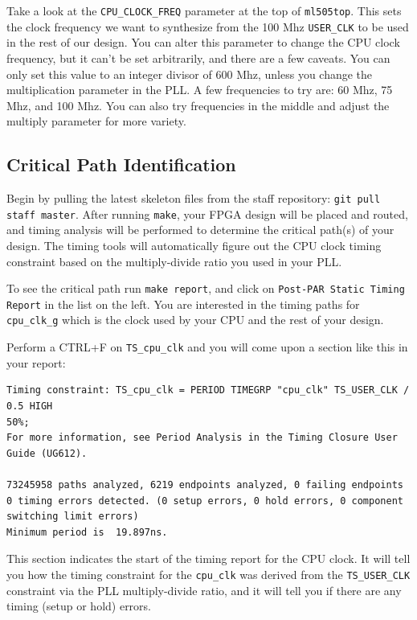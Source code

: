 \documentclass[11pt]{article}
\begin{document}
Take a look at the \verb|CPU_CLOCK_FREQ| parameter at the top of \verb|ml505top|. This sets the clock frequency we want to synthesize from the 100 Mhz \verb|USER_CLK| to be used in the rest of our design. You can alter this parameter to change the CPU clock frequency, but it can't be set arbitrarily, and there are a few caveats. You can only set this value to an integer divisor of 600 Mhz, unless you change the multiplication parameter in the PLL. A few frequencies to try are: 60 Mhz, 75 Mhz, and 100 Mhz. You can also try frequencies in the middle and adjust the multiply parameter for more variety.

\subsection{Critical Path Identification}
Begin by pulling the latest skeleton files from the staff repository: \verb|git pull staff master|. After running \verb|make|, your FPGA design will be placed and routed, and timing analysis will be performed to determine the critical path(s) of your design. The timing tools will automatically figure out the CPU clock timing constraint based on the multiply-divide ratio you used in your PLL. 

To see the critical path run \verb|make report|, and click on \verb|Post-PAR Static Timing Report| in the list on the left. You are interested in the timing paths for \verb|cpu_clk_g| which is the clock used by your CPU and the rest of your design.

Perform a CTRL+F on \verb|TS_cpu_clk| and you will come upon a section like this in your report:

\begin{verbatim}
Timing constraint: TS_cpu_clk = PERIOD TIMEGRP "cpu_clk" TS_USER_CLK / 0.5 HIGH 
50%;
For more information, see Period Analysis in the Timing Closure User Guide (UG612).

73245958 paths analyzed, 6219 endpoints analyzed, 0 failing endpoints
0 timing errors detected. (0 setup errors, 0 hold errors, 0 component switching limit errors)
Minimum period is  19.897ns.
\end{verbatim}

This section indicates the start of the timing report for the CPU clock. It will tell you how the timing constraint for the \verb|cpu_clk| was derived from the \verb|TS_USER_CLK| constraint via the PLL multiply-divide ratio, and it will tell you if there are any timing (setup or hold) errors.
\end{document}
